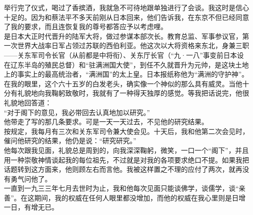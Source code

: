 举行完了仪式，喝过了香摈酒，我就急不可待地跟单独进行了会谈。我这时是信心十足的。因为和蔡法平不多天前刚从日本回来，他们告诉我，在东京不但已经同意了我的要求，而且连恢复我的尊号都答应予以考虑哩。\\

是日本大正时代晋升的陆军大将，做过参谋本部次长。教育总监、军事参议官，第一次世界大战率日军占领过苏联的西伯利亚。他这次以大将资格来东北，身兼三职——关东军司令长官（从前都是中将衔）、关东厅长官（“九·一八”事变前日本设在辽东半岛的殖民总督）和“驻满洲国大使”，到任不久就晋升为元帅，是这块土地上的事实上的最高统治者，“满洲国”的太上皇。日本报纸称他为“满洲的守护神”。在我的眼里，这个六十五岁的白发老头，确实像一个神似的那么具有威灵。当他十分有礼貌地向我鞠躬致敬时，我就有了一种得天独厚的感觉。等我把话说完，他很礼貌地回答道：\\

“对于阁下的意见，我必带回去认真地加以研究。”\\

他带走了写的那几条要求。可是一天一天过去，不见他的研究结果。\\

按规定，我每月有三次和关东军司令兼大使会见。十天后，我和他第二次会见时，催问他研究的结果，他仍是说：“研究研究。”\\

他每次跟我见面，礼貌总是周到的，向我深深鞠躬，微笑，一口一个“阁下”，并且用一种崇敬神情谈起我的每位祖先，不过就是对我的各项要求绝口不提。如果我把话题转到这方面来，他则顾左右而言他。我被这样置之不理的应付了两次，就再没有勇气问他了。\\

一直到一九三三年七月去世时为止，我和他每次见面只能谈佛学，谈儒学，谈“亲善”。在这期间，我的权威在任何人眼里都没增加，而他的权威在我心里则是日增一日，有增无已。
